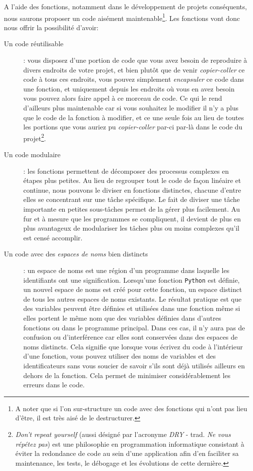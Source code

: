 \documentclass[a4paper,11pt]{book}
\begin{document}
A l'aide des fonctions, notamment dans le développement de projets conséquents, nous saurons proposer un code aisément maintenable\footnote{A noter que si l'on sur-structure un code avec des fonctions qui n'ont pas lieu d'être, il est très aisé de le destructurer.}. Les fonctions vont donc nous offrir la possibilité d'avoir:
\begin{description}
	\item[Un code réutilisable]: vous disposez d'une portion de code que vous avez besoin de reproduire à divers endroits de votre projet, et bien plutôt que de venir \textit{copier-coller} ce code à tous ces endroits, vous pouvez simplement \textit{encapsuler} ce code dans une fonction, et uniquement depuis les endroits où vous en avez besoin vous pouvez alors faire appel à ce morceau de code. Ce qui le rend d'ailleurs plus maintenable car si vous souhaitez le modifier il n'y a plus que le code de la fonction à modifier, et ce une seule fois au lieu de toutes les portions que vous auriez pu \textit{copier-coller} par-ci par-là dans le code du projet\footnote{\og \textit{Don't repeat yourself}\fg{} (aussi désigné par l’acronyme \textit{DRY} - trad. \og \textit{Ne vous répétez pas}\fg{}) est une philosophie en programmation informatique consistant à éviter la redondance de code au sein d’une application afin d'en faciliter sa maintenance, les tests, le débogage et les évolutions de cette dernière.}.
	\item[Un code modulaire]: les fonctions permettent de décomposer des processus complexes en étapes plus petites. Au lieu de regrouper tout le code de façon linéaire et continue, nous pouvons le diviser en fonctions distinctes, chacune d'entre elles se concentrant sur une tâche spécifique. Le fait de diviser une tâche importante en petites sous-tâches permet de la gérer plus facilement. Au fur et à mesure que les programmes se compliquent, il devient de plus en plus avantageux de  modulariser les tâches plus ou moins complexes qu'il est censé accomplir.
	\item[Un code avec des \textit{espaces de noms} bien distincts]: un espace de noms est une région d'un programme dans laquelle les identifiants ont une signification. Lorsqu'une fonction \texttt{Python} est définie, un nouvel espace de noms est créé pour cette fonction, un espace distinct de tous les autres espaces de noms existants. Le résultat pratique est que des variables peuvent être définies et utilisées dans une fonction même si elles portent le même nom que des variables définies dans d'autres fonctions ou dans le programme principal. Dans ces cas, il n'y aura pas de confusion ou d'interférence car elles sont conservées dans des espaces de noms distincts. Cela signifie que lorsque vous écrivez du code à l'intérieur d'une fonction, vous pouvez utiliser des noms de variables et des identificateurs sans vous soucier de savoir s'ils sont déjà utilisés ailleurs en dehors de la fonction. Cela permet de minimiser considérablement les erreurs dans le code.
\end{description}
\medskip
\end{document}
